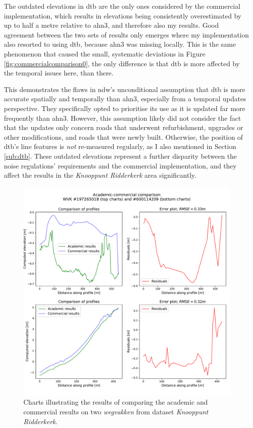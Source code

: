 The outdated elevations in \ac{dtb} are the only ones considered by the commercial implementation, which results in elevations being consistently overestimated by up to half a metre relative to \ac{ahn3}, and therefore also my results. Good agreement between the two sets of results only emerges where my implementation also resorted to using \ac{dtb}, because \ac{ahn3} was missing locally. This is the same phenomenon that caused the small, systematic deviations in Figure \ref{fig:commercialcomparison0}, the only difference is that \ac{dtb} is more affected by the temporal issues here, than there.

This demonstrates the flaws in \ac{ndw}'s unconditional assumption that \ac{dtb} is more accurate spatially and temporally than \ac{ahn3}, especially from a temporal updates perspective. They specifically opted to prioritise its use as it is updated far more frequently than \ac{ahn3}. However, this assumption likely did not consider the fact that the updates only concern roads that underwent refurbishment, upgrades or other modifications, and roads that were newly built. Otherwise, the position of \ac{dtb}'s line features is \textit{not} re-measured regularly, as I also mentioned in Section \ref{sub:dtb}. These outdated elevations represent a further disparity between the noise regulations' requirements and the commercial implementation, and they affect the results in the \textit{Knooppunt Ridderkerk} area significantly.

\begin{figure}
    \centering
    \includegraphics[width=0.9\linewidth]{final_report/figs/commercialcomparison2.pdf}
    \caption{Charts illustrating the results of comparing the academic and commercial results on two \textit{wegvakken} from dataset \textit{Knooppunt Ridderkerk}.}
    \label{fig:commercialcomparison2}
\end{figure}

